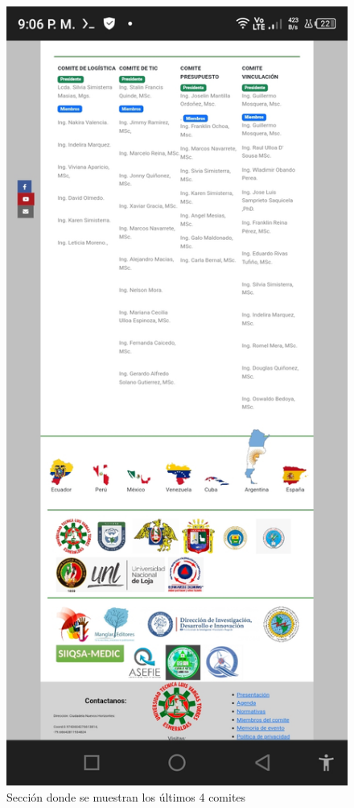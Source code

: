 \documentclass[a4paper,14px]{article}
\begin{document}
\begin{minipage}[H]{0.45\linewidth}
  \begin{figure}[H]
    \centering
    \includegraphics[scale=0.25]{comite2.jpg}
    \caption{Sección donde se muestran los últimos 4 comites}
    \label{fig:comite2}
  \end{figure}
\end{minipage}
\end{document}

